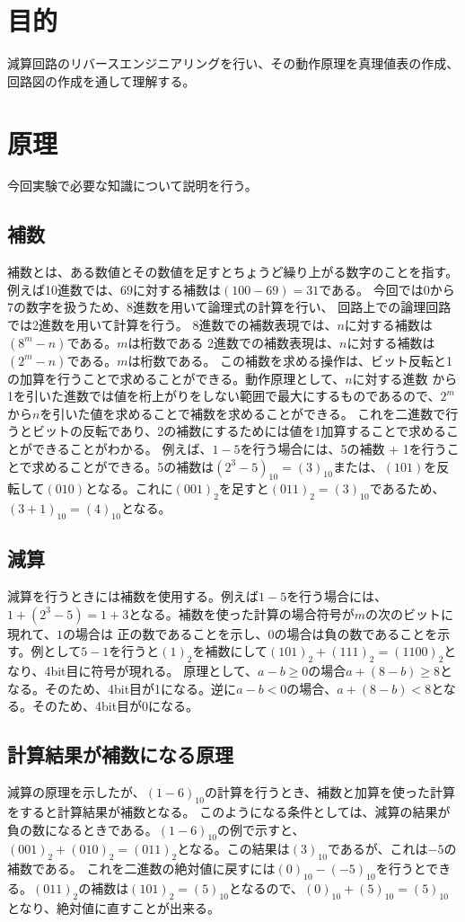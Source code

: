 \documentclass[a4paper,11pt]{ltjsarticle}
\begin{document}
\section{目的}
減算回路のリバースエンジニアリングを行い、その動作原理を真理値表の作成、回路図の作成を通して理解する。
\section{原理}
今回実験で必要な知識について説明を行う。
\subsection{補数}
補数とは、ある数値とその数値を足すとちょうど繰り上がる数字のことを指す。
例えば10進数では、$69$に対する補数は$(100 - 69) = 31$である。
今回では0から7の数字を扱うため、8進数を用いて論理式の計算を行い、
回路上での論理回路では2進数を用いて計算を行う。
8進数での補数表現では、$n$に対する補数は$(8^m - n)$である。$m$は桁数である
2進数での補数表現は、$n$に対する補数は$(2^m - n)$である。$m$は桁数である。
この補数を求める操作は、ビット反転と1の加算を行うことで求めることができる。動作原理として、$n$に対する進数
から1を引いた進数では値を桁上がりをしない範囲で最大にするものであるので、$2^m$から$n$を引いた値を求めることで補数を求めることができる。
これを二進数で行うとビットの反転であり、2の補数にするためには値を1加算することで求めることができることがわかる。
例えば、$1 - 5$を行う場合には、5の補数 + 1を行うことで求めることができる。5の補数は$(2^3 - 5)_{10}= (3)_{10}$または、$(101)$を反転して$(010)$となる。これに$(001)_2$を足すと$(011)_2 = (3)_{10}$であるため、$(3 + 1)_{10} = (4)_{10}$となる。
\subsection{減算}
減算を行うときには補数を使用する。例えば$1 - 5$を行う場合には、$1 + (2^3 - 5) = 1 + 3$となる。補数を使った計算の場合符号が$m$の次のビットに現れて、$1$の場合は
正の数であることを示し、$0$の場合は負の数であることを示す。例として$5 - 1$を行うと$(1)_2$を補数にして$ (101)_2 + (111)_2 = (1100)_2$となり、4bit目に符号が現れる。
原理として、$a - b \geq 0$の場合$ a + (8 - b) \geq 8$となる。そのため、4bit目が1になる。逆に$a - b < 0$の場合、$a + (8 - b) < 8$となる。そのため、4bit目が0になる。
\subsection{計算結果が補数になる原理}
減算の原理を示したが、$(1-6)_{10}$の計算を行うとき、補数と加算を使った計算をすると計算結果が補数となる。
このようになる条件としては、減算の結果が負の数になるときである。$(1 - 6)_{10}$の例で示すと、$(001)_2 + (010)_2 = (011)_2$となる。この結果は$(3)_{10}$であるが、これは$-5$の補数である。
これを二進数の絶対値に戻すには$(0)_{10} -(- 5)_{10}$を行うとできる。$(011)_2$の補数は$(101)_2 = (5)_{10}$となるので、$(0)_{10} + (5)_{10} = (5)_{10} $となり、絶対値に直すことが出来る。
\end{document}
